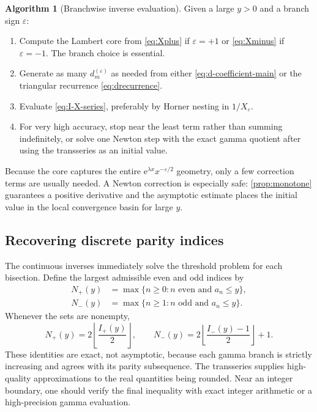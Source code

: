 \documentclass[11pt]{article}
\theoremstyle{definition}
\newtheorem{algorithm}[theorem]{Algorithm}
\theoremstyle{remark}
\newcommand{\eps}{\varepsilon}
\newcommand{\lam}{\lambda}
\newcommand{\e}{\mathrm e}
\newcommand{\floor}[1]{\left\lfloor #1\right\rfloor}
\begin{document}
\begin{algorithm}[Branchwise inverse evaluation]\label{alg:evaluate-inverse}
Given a large $y>0$ and a branch sign $\eps$:
\begin{enumerate}
\item Compute the Lambert core from \eqref{eq:Xplus} if $\eps=+1$ or \eqref{eq:Xminus} if $\eps=-1$.  The branch choice is essential.
\item Generate as many $d_m^{(\eps)}$ as needed from either \eqref{eq:d-coefficient-main} or the triangular recurrence \eqref{eq:drecurrence}.
\item Evaluate \eqref{eq:I-X-series}, preferably by Horner nesting in $1/X_\eps$.
\item For very high accuracy, stop near the least term rather than summing indefinitely, or solve one Newton step with the exact gamma quotient after using the transseries as an initial value.
\end{enumerate}
\end{algorithm}

Because the core captures the entire $\e^{\lam x}x^{-\eps/2}$ geometry, only a few correction terms are usually needed.  A Newton correction is especially safe: \cref{prop:monotone} guarantees a positive derivative and the asymptotic estimate places the initial value in the local convergence basin for large $y$.

\subsection{Recovering discrete parity indices}

The continuous inverses immediately solve the threshold problem for each bisection.  Define the largest admissible even and odd indices by
\begin{align}
 N_+(y)&=\max\{n\ge0:n\text{ even and }a_n\le y\},\label{eq:Nplus}\\
 N_-(y)&=\max\{n\ge1:n\text{ odd and }a_n\le y\}.
\label{eq:Nminus}
\end{align}
Whenever the sets are nonempty,
\begin{equation}\label{eq:discrete-rounding}
 N_+(y)=2\floor{\frac{I_+(y)}2},
 \qquad
 N_-(y)=2\floor{\frac{I_-(y)-1}{2}}+1.
\end{equation}
These identities are exact, not asymptotic, because each gamma branch is strictly increasing and agrees with its parity subsequence.  The transseries supplies high-quality approximations to the real quantities being rounded.  Near an integer boundary, one should verify the final inequality with exact integer arithmetic or a high-precision gamma evaluation.
\end{document}
